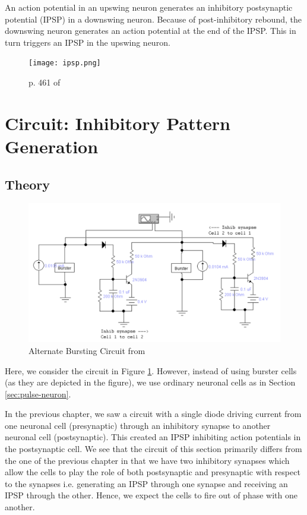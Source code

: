 \documentclass[12]{book}
\newcommand\0{\mathbf{0}}
\newcommand\<{\langle}
\renewcommand\>{\rangle}
\begin{document}
An action potential in an upswing neuron generates an inhibitory postsynaptic potential (IPSP) in a downswing neuron. Because of post-inhibitory rebound, the downswing neuron generates an action potential at the end of the IPSP. This in turn triggers an IPSP in the upswing neuron.


\begin{figure}[h]
\centering
\texttt{[image: ipsp.png]}	
\caption{p. 461 of \cite{levitan2015neuron}}
\end{figure}

\section{Circuit: Inhibitory Pattern Generation}

\subsection{Theory}

\begin{figure}[h]
\label{fig:pattern}
\centering
\includegraphics[width=\textwidth]{pattern_circuit}	
\caption{Alternate Bursting Circuit from \cite{maeda2000pulse}}
\end{figure}

Here, we consider the circuit in Figure \ref{fig:pattern}. However, instead of using burster cells (as they are depicted in the figure), we use ordinary neuronal cells as in Section \ref{sec:pulse-neuron}.

In the previous chapter, we saw a circuit with a single diode driving current from one neuronal cell (presynaptic) through an inhibitory synapse to another neuronal cell (postsynaptic). This created an IPSP inhibiting action potentials in the postsynaptic cell. We see that the circuit of this section primarily differs from the one of the previous chapter in that we have two inhibitory synapses which allow the cells to play the role of both postsynaptic and presynaptic with respect to the synapses i.e. generating an IPSP through one synapse and receiving an IPSP through the other. Hence, we expect the cells to fire out of phase with one another.
\end{document}
